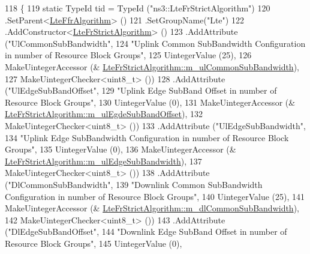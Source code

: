 \begin{DoxyCode}
118 \{
119   \textcolor{keyword}{static} TypeId tid = TypeId (\textcolor{stringliteral}{"ns3::LteFrStrictAlgorithm"})
120     .SetParent<\hyperlink{classns3_1_1LteFfrAlgorithm_a1cfb2b0c9339553d90bf3eee7b66b25f}{LteFfrAlgorithm}> ()
121     .SetGroupName(\textcolor{stringliteral}{"Lte"})
122     .AddConstructor<\hyperlink{classns3_1_1LteFrStrictAlgorithm_abd1822168a6ca294319f7c1d688d2f6b}{LteFrStrictAlgorithm}> ()
123     .AddAttribute (\textcolor{stringliteral}{"UlCommonSubBandwidth"},
124                    \textcolor{stringliteral}{"Uplink Common SubBandwidth Configuration in number of Resource Block Groups"},
125                    UintegerValue (25),
126                    MakeUintegerAccessor (&
      \hyperlink{classns3_1_1LteFrStrictAlgorithm_a084d7a8d816f5c82155be6381333a797}{LteFrStrictAlgorithm::m\_ulCommonSubBandwidth}),
127                    MakeUintegerChecker<uint8\_t> ())
128     .AddAttribute (\textcolor{stringliteral}{"UlEdgeSubBandOffset"},
129                    \textcolor{stringliteral}{"Uplink Edge SubBand Offset in number of Resource Block Groups"},
130                    UintegerValue (0),
131                    MakeUintegerAccessor (&
      \hyperlink{classns3_1_1LteFrStrictAlgorithm_a4f177f41bee1fdb257412b3f83874d8c}{LteFrStrictAlgorithm::m\_ulEgdeSubBandOffset}),
132                    MakeUintegerChecker<uint8\_t> ())
133     .AddAttribute (\textcolor{stringliteral}{"UlEdgeSubBandwidth"},
134                    \textcolor{stringliteral}{"Uplink Edge SubBandwidth Configuration in number of Resource Block Groups"},
135                    UintegerValue (0),
136                    MakeUintegerAccessor (&
      \hyperlink{classns3_1_1LteFrStrictAlgorithm_a3e5d87899b41ec73b5e4aa65465e497a}{LteFrStrictAlgorithm::m\_ulEdgeSubBandwidth}),
137                    MakeUintegerChecker<uint8\_t> ())
138     .AddAttribute (\textcolor{stringliteral}{"DlCommonSubBandwidth"},
139                    \textcolor{stringliteral}{"Downlink Common SubBandwidth Configuration in number of Resource Block Groups"},
140                    UintegerValue (25),
141                    MakeUintegerAccessor (&
      \hyperlink{classns3_1_1LteFrStrictAlgorithm_a22e3907faf3ed6210a76917b4f6b85f2}{LteFrStrictAlgorithm::m\_dlCommonSubBandwidth}),
142                    MakeUintegerChecker<uint8\_t> ())
143     .AddAttribute (\textcolor{stringliteral}{"DlEdgeSubBandOffset"},
144                    \textcolor{stringliteral}{"Downlink Edge SubBand Offset in number of Resource Block Groups"},
145                    UintegerValue (0),

\end{DoxyCode}
